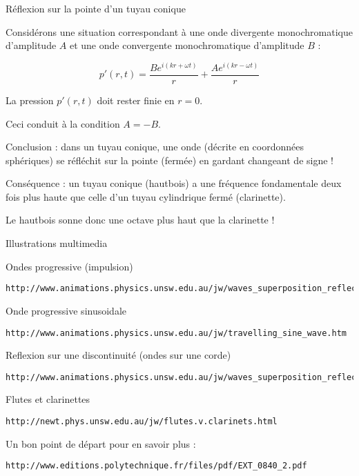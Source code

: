 \begin{frame}{Réflexion sur la pointe d'un tuyau conique}

Considérons une situation correspondant à une onde divergente monochromatique d'amplitude $A$ et une onde convergente monochromatique d'amplitude $B$ :

$$
p'(r,t) =    \frac{B e^{i(kr +\omega t)}}{r} + \frac{A e^{i(kr -\omega t)}}{r} 
$$

La pression $p'(r,t)$ doit rester finie en $r=0$.

Ceci conduit à la condition $A=-B$.

\medskip

Conclusion : dans un tuyau conique, une onde (décrite en coordonnées sphériques) se réfléchit sur la pointe (fermée) en gardant changeant de signe !

\medskip

Conséquence : un tuyau conique (hautbois) a une fréquence fondamentale deux fois plus haute que celle d'un tuyau cylindrique fermé (clarinette). 

Le hautbois sonne donc une octave plus haut que la clarinette !



\end{frame}

\begin{frame}[fragile]{Illustrations multimedia}

\small
Ondes progressive (impulsion)

{\scriptsize
\begin{verbatim}
http://www.animations.physics.unsw.edu.au/jw/waves_superposition_reflection.htm#travelling
\end{verbatim}
}

Onde progressive sinusoidale

{\scriptsize
\begin{verbatim}
http://www.animations.physics.unsw.edu.au/jw/travelling_sine_wave.htm
\end{verbatim}
}


Reflexion sur une discontinuité (ondes sur une corde)

{\scriptsize
\begin{verbatim}
http://www.animations.physics.unsw.edu.au/jw/waves_superposition_reflection.htm#densities
\end{verbatim}
}

Flutes et clarinettes
{\scriptsize
\begin{verbatim}
http://newt.phys.unsw.edu.au/jw/flutes.v.clarinets.html
\end{verbatim}
}

Un bon point de départ pour en savoir plus :

{\scriptsize
\begin{verbatim}
http://www.editions.polytechnique.fr/files/pdf/EXT_0840_2.pdf
\end{verbatim}
}

\end{frame}


